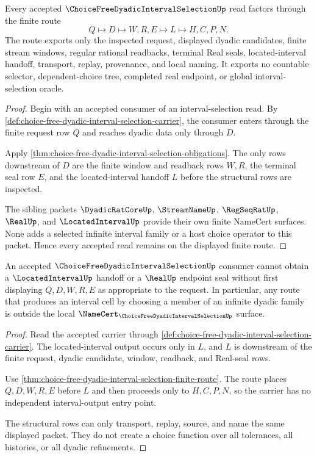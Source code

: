 \begin{theorem}
\label{thm:choice-free-dyadic-interval-selection-finite-route}
Every accepted $\ChoiceFreeDyadicIntervalSelectionUp$ read factors through the finite route
$$
Q \longmapsto D \longmapsto W,R,E \longmapsto L \longmapsto H,C,P,N .
$$
The route exports only the inspected request, displayed dyadic candidates, finite stream windows, regular rational readbacks, terminal Real seals, located-interval handoff, transport, replay, provenance, and local naming. It exports no countable selector, dependent-choice tree, completed real endpoint, or global interval-selection oracle.
\end{theorem}
\begin{proof}
Begin with an accepted consumer of an interval-selection read. By \autoref{def:choice-free-dyadic-interval-selection-carrier}, the consumer enters through the finite request row $Q$ and reaches dyadic data only through $D$.

Apply \autoref{thm:choice-free-dyadic-interval-selection-obligations}. The only rows downstream of $D$ are the finite window and readback rows $W,R$, the terminal seal row $E$, and the located-interval handoff $L$ before the structural rows are inspected.

The sibling packets $\DyadicRatCoreUp$, $\StreamNameUp$, $\RegSeqRatUp$, $\RealUp$, and $\LocatedIntervalUp$ provide their own finite NameCert surfaces. None adds a selected infinite interval family or a host choice operator to this packet. Hence every accepted read remains on the displayed finite route.
\end{proof}

\begin{theorem}
\label{thm:choice-free-dyadic-interval-selection-nonescape}
An accepted $\ChoiceFreeDyadicIntervalSelectionUp$ consumer cannot obtain a $\LocatedIntervalUp$ handoff or a $\RealUp$ endpoint seal without first displaying $Q,D,W,R,E$ as appropriate to the request. In particular, any route that produces an interval cell by choosing a member of an infinite dyadic family is outside the local $\NameCert_{\ChoiceFreeDyadicIntervalSelectionUp}$ surface.
\end{theorem}
\begin{proof}
Read the accepted carrier through \autoref{def:choice-free-dyadic-interval-selection-carrier}. The located-interval output occurs only in $L$, and $L$ is downstream of the finite request, dyadic candidate, window, readback, and Real-seal rows.

Use \autoref{thm:choice-free-dyadic-interval-selection-finite-route}. The route places $Q,D,W,R,E$ before $L$ and then proceeds only to $H,C,P,N$, so the carrier has no independent interval-output entry point.

The structural rows can only transport, replay, source, and name the same displayed packet. They do not create a choice function over all tolerances, all histories, or all dyadic refinements.
\end{proof}

